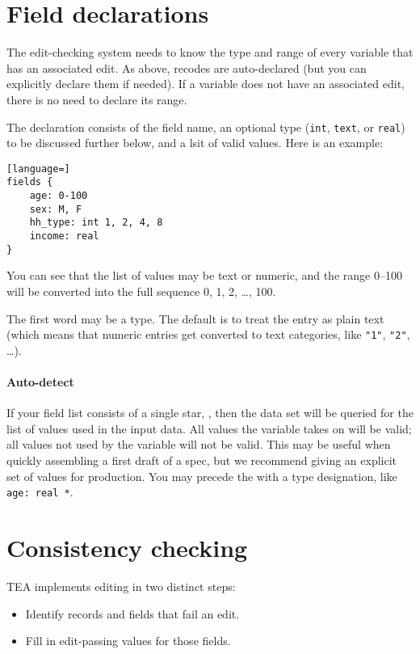 \documentclass{article}
\def\tighten{ \setlength{\itemsep}{1pt}
    \setlength{\parskip}{0pt}}
\begin{document}
\section{Field declarations} The edit-checking system needs to know the type and range
of every variable that has an associated edit. As above, recodes are auto-declared (but
you can explicitly declare them if needed). If a variable does not have an associated
edit, there is no need to declare its range.

The declaration consists of the field name, an
optional type ({\tt int}, {\tt text}, or {\tt real}) to be discussed further below, and a
lsit of valid values. Here is an example:

\begin{lstlisting}[language=]
fields {
    age: 0-100
    sex: M, F
    hh_type: int 1, 2, 4, 8
    income: real
}
\end{lstlisting}

You can see that the list of values may be text or numeric, and the range 0--100 will be
converted into the full sequence 0, 1, 2, \dots, 100.  

The first word may be a type. The default is to treat the entry as plain text (which means
that numeric entries get converted to text categories, like {\tt "1"}, {\tt "2"}, \dots).

\paragraph{Auto-detect} If your field list consists of a single star, {\tt *}, then the
data set will be queried for the list of values used in the input data. All values the
variable takes on will be valid; all values not used by the variable will not be valid.
This may be useful when quickly assembling a first draft of a spec, but we recommend
giving an explicit set of values for production. You may precede the {\tt *}
with a type designation, like {\tt age: real *}.



\section{Consistency checking}\label{consistencysection}
TEA implements editing in two distinct steps:
\begin{itemize}
\tighten
\item Identify records and fields that fail an edit.
\item Fill in edit-passing values for those fields.
\end{itemize}
\end{document}
